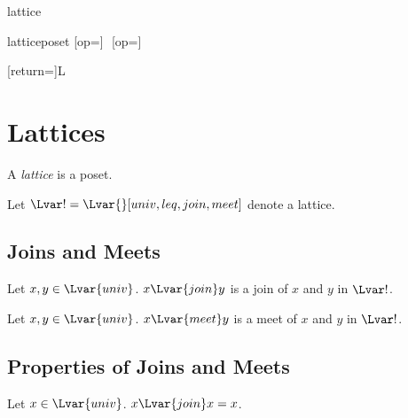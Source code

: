 \documentclass{stex}
\begin{document}
\begin{smodule}{lattice}

  \begin{extstructure}{lattice}{poset}
    [op=\vee]{\,\vee\,}
    [op=\wedge]{\,\wedge\,}
  \end{extstructure}

  [return={\lattice[comp=##1]}]{\mathcal L}

  \section{Lattices}

  \begin{forthel}
  \end{forthel}
  
  \begin{forthel}
    \begin{signature*}
      A \emph{lattice} is a poset.
    \end{signature*}

    Let $\Lvar! = \Lvar{}[univ,leq,join,meet]$ denote a lattice.
  \end{forthel}
  
  \subsection{Joins and Meets}
  
  \begin{forthel}
    \begin{signature*}
      Let $x, y \in \Lvar{univ}$.
      $x {\Lvar{join}} y$ is a join of $x$ and $y$ in $\Lvar!$.
    \end{signature*}

    \begin{signature*}
      Let $x, y \in \Lvar{univ}$.
      $x {\Lvar{meet}} y$ is a meet of $x$ and $y$ in $\Lvar!$.
    \end{signature*}
  \end{forthel}

  \subsection{Properties of Joins and Meets}

  \begin{forthel}
    \begin{proposition*}
      Let $x \in \Lvar{univ}$.
      $x {\Lvar{join}} x = x$.
    \end{proposition*}


\end{forthel}
\end{smodule}
\end{document}
